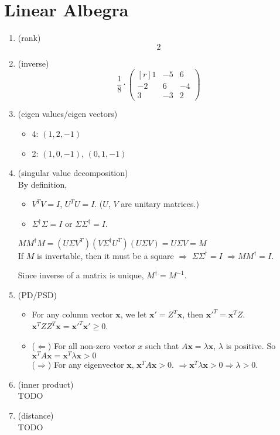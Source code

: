 \renewcommand{\vec}[1]{\mathbf{#1}}

\section{Linear Albegra}
\begin{enumerate}[(1)]
	\item (rank) \\
		\[ 2 \]
	\item (inverse) \\
		\[
			\frac{1}{8} \cdot
			\begin{pmatrix*}[r]
				1 & -5 & 6 \\
				-2 & 6 & -4 \\
				3 & -3 & 2
			\end{pmatrix*}
		\]
	\item (eigen values/eigen vectors)
		\begin{itemize}
			\item 4: $(1, 2, -1)$
			\item 2: $(1, 0, -1)$, $(0, 1, -1)$
		\end{itemize}
	\item (singular value decomposition) \\
		By definition,
		\begin{itemize}
			\item $V^T V=I$, $U^T U=I$. ($U$, $V$ are unitary matrices.)
			\item $\Sigma^{\dagger}\Sigma=I$ or $\Sigma\Sigma^{\dagger}=I$.
		\end{itemize}
		$MM^{\dagger}M = (U\Sigma V^T)(V\Sigma^{\dagger}U^T)(U\Sigma V) = U\Sigma V = M$ \\
		If $M$ is invertable, then it must be a square $\Rightarrow$ $\Sigma\Sigma^{\dagger}=I$ $\Rightarrow MM^{\dagger}=I$.

		Since inverse of a matrix is unique, $M^{\dagger}=M^{-1}$.
	\item (PD/PSD)
		\begin{itemize}
			\item For any column vector $\vec{x}$, we let $\vec{x'} = Z^T\vec{x}$,
				then $\vec{x'}^T = \vec{x}^TZ$.$\vec{x}^TZZ^T \vec{x} = \vec{x'}^T\vec{x'} \geq 0$.
			\item ($\Leftarrow$) For all non-zero vector $x$ such that
				$A\vec{x} = \lambda \vec{x}$, $\lambda$ is positive.  So
				$\vec{x}^TA\vec{x} = \vec{x}^T\lambda \vec{x} > 0$ \\
				($\Rightarrow$) For any eigenvector $\vec{x}$, $\vec{x}^TA\vec{x} > 0$.
				$\Rightarrow \vec{x}^T\lambda \vec{x} > 0 \Rightarrow \lambda > 0$.
		\end{itemize}
	\item (inner product) \\
		TODO
	\item (distance) \\
		TODO
\end{enumerate}
